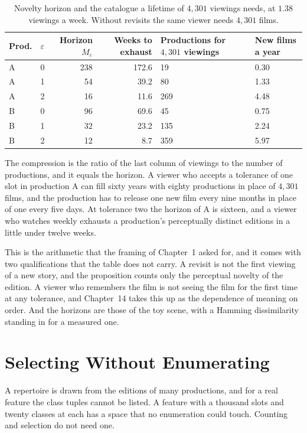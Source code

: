 \documentclass[11pt,twoside,openright]{book}
\theoremstyle{plain}
\theoremstyle{definition}
\theoremstyle{remark}
\begin{document}
\begin{table}[ht]
\centering
\begin{tabular}{@{}llrrp{2.6cm}p{1.6cm}@{}}
\toprule
Prod. & $\varepsilon$ & Horizon $M_\varepsilon$ & Weeks to exhaust & Productions for $4{,}301$ viewings & New films a year\\
\midrule
A & 0 & 238 & 172.6 & 19 & 0.30\\
A & 1 & 54 & 39.2 & 80 & 1.33\\
A & 2 & 16 & 11.6 & 269 & 4.48\\
B & 0 & 96 & 69.6 & 45 & 0.75\\
B & 1 & 32 & 23.2 & 135 & 2.24\\
B & 2 & 12 & 8.7 & 359 & 5.97\\
\bottomrule
\end{tabular}
\caption{Novelty horizon and the catalogue a lifetime of $4{,}301$ viewings needs, at $1.38$ viewings a week. Without revisits the same viewer needs $4{,}301$ films.}\label{tab:horizon13}
\end{table}

The compression is the ratio of the last column of viewings to the number of productions, and it equals the horizon. A viewer who accepts a tolerance of one slot in production A can fill sixty years with eighty productions in place of $4{,}301$ films, and the production has to release one new film every nine months in place of one every five days. At tolerance two the horizon of A is sixteen, and a viewer who watches weekly exhausts a production's perceptually distinct editions in a little under twelve weeks.

This is the arithmetic that the framing of Chapter~1 asked for, and it comes with two qualifications that the table does not carry. A revisit is not the first viewing of a new story, and the proposition counts only the perceptual novelty of the edition. A viewer who remembers the film is not seeing the film for the first time at any tolerance, and Chapter~14 takes this up as the dependence of meaning on order. And the horizons are those of the toy scene, with a Hamming dissimilarity standing in for a measured one.

\section{Selecting Without Enumerating}\label{sec:select13}

A repertoire is drawn from the editions of many productions, and for a real feature the class tuples cannot be listed. A feature with a thousand slots and twenty classes at each has a space that no enumeration could touch. Counting and selection do not need one.
\end{document}
